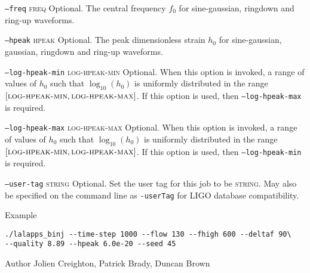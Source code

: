 \begin{entry}
\begin{entry}
\item[\texttt{--freq} \textsc{freq}]
Optional.  The central frequency $f_0$ for sine-gaussian,  ringdown and
ring-up waveforms.

\item[\texttt{--hpeak} \textsc{hpeak}]
Optional.  The peak dimensionless strain $h_0$ for sine-gaussian,  gaussian,  ringdown and
ring-up waveforms.

\item[\texttt{--log-hpeak-min} \textsc{log-hpeak-min}]
Optional.  When this option is invoked,  a range of values of $h_0$
such that $\log_{10}(h_0)$ is uniformly distributed in the range $[
\textsc{log-hpeak-min}, \textsc{log-hpeak-max}]$.  If this option is
used,  then \texttt{--log-hpeak-max} is required.

\item[\texttt{--log-hpeak-max} \textsc{log-hpeak-max}]
Optional.  When this option is invoked,  a range of values of $h_0$
such that $\log_{10}(h_0)$ is uniformly distributed in the range $[
\textsc{log-hpeak-min}, \textsc{log-hpeak-max}]$.  If this option is
used,  then \texttt{--log-hpeak-min} is required.

\item[\texttt{--user-tag} \textsc{string}] Optional. Set the user tag for this
job to be \textsc{string}. May also be specified on the command line as 
\texttt{-userTag} for LIGO database compatibility.

\end{entry}

\item[Example]
\begin{verbatim}
./lalapps_binj --time-step 1000 --flow 130 --fhigh 600 --deltaf 90\
--quality 8.89 --hpeak 6.0e-20 --seed 45
\end{verbatim}

\item[Author] 
Jolien Creighton, Patrick Brady, Duncan Brown
\end{entry}

